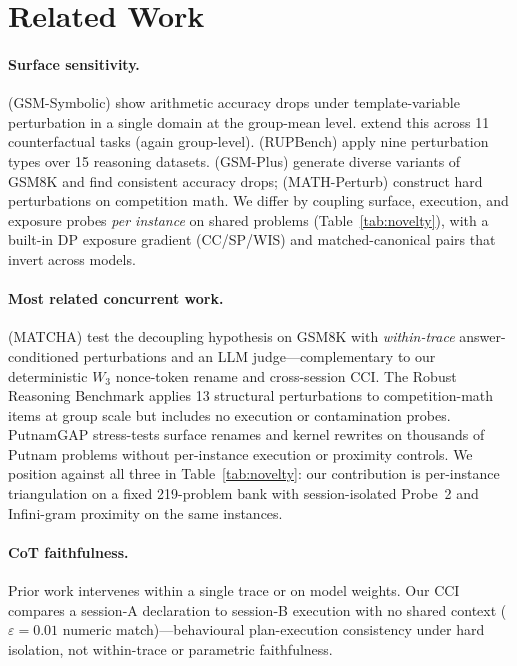 \documentclass{article}
\newcommand{\wthree}{\ensuremath{W_3}}
\newcommand{\eps}{\varepsilon}
\begin{document}
\section{Related Work}
\label{sec:related}

\paragraph{Surface sensitivity.}
\citet{mirzadeh2024gsm} (GSM-Symbolic) show arithmetic accuracy drops under
template-variable perturbation in a single domain at the group-mean level.
\citet{wu2024reasoning} extend this across 11 counterfactual tasks (again
group-level). \citet{wang2024rupbench} (RUPBench) apply nine perturbation
types over 15 reasoning datasets. \citet{li2024gsm} (GSM-Plus) generate
diverse variants of GSM8K and find consistent accuracy drops;
\citet{huang2025mathperturb} (MATH-Perturb) construct hard perturbations on
competition math. We differ by coupling surface, execution, and exposure
probes \emph{per instance} on shared problems (Table~\ref{tab:novelty}),
with a built-in DP exposure gradient (CC/SP/WIS) and matched-canonical pairs
that invert across models.

\paragraph{Most related concurrent work.}
\citet{kumar2025matcha} (MATCHA) test the decoupling hypothesis on GSM8K
with \emph{within-trace} answer-conditioned perturbations and an LLM
judge---complementary to our deterministic \wthree{} nonce-token rename and
cross-session CCI. The Robust Reasoning Benchmark \citep{rrb2026} applies 13
structural perturbations to competition-math items at group scale but
includes no execution or contamination probes. PutnamGAP
\citep{hao2025putnamgap} stress-tests surface renames and kernel rewrites on
thousands of Putnam problems without per-instance execution or proximity
controls. We position against all three in Table~\ref{tab:novelty}: our
contribution is per-instance triangulation on a fixed 219-problem bank with
session-isolated Probe~2 and Infini-gram proximity on the same instances.

\paragraph{CoT faithfulness.}
Prior work
\citep{turpin2023language,lanham2023measuring,saparov2023language,lightman2023let,tutek2025measuring}
intervenes within a single trace or on model weights. Our CCI compares a
session-A declaration to session-B execution with no shared context
($\eps{=}0.01$ numeric match)---behavioural plan-execution consistency under
hard isolation, not within-trace or parametric faithfulness.
\end{document}
